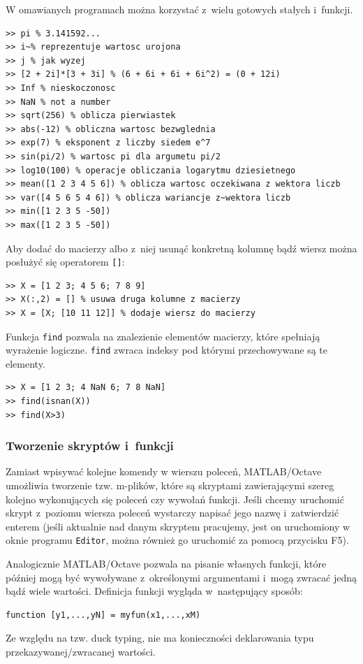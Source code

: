 W omawianych programach można korzystać z~wielu gotowych stałych i~funkcji. 
\begin{lstlisting}[caption=Przykładowe stałe i funkcje , label=lab1/lst/constantsAndFucntions]
>> pi % 3.141592...
>> i~% reprezentuje wartosc urojona
>> j % jak wyzej
>> [2 + 2i]*[3 + 3i] % (6 + 6i + 6i + 6i^2) = (0 + 12i)
>> Inf % nieskoczonosc
>> NaN % not a number
>> sqrt(256) % oblicza pierwiastek
>> abs(-12) % obliczna wartosc bezwglednia
>> exp(7) % eksponent z liczby siedem e^7
>> sin(pi/2) % wartosc pi dla argumetu pi/2
>> log10(100) % operacje obliczania logarytmu dziesietnego
>> mean([1 2 3 4 5 6]) % oblicza wartosc oczekiwana z wektora liczb
>> var([4 5 6 5 4 6]) % oblicza wariancje z~wektora liczb
>> min([1 2 3 5 -50])
>> max([1 2 3 5 -50])
\end{lstlisting}

Aby dodać do macierzy albo z~niej usunąć konkretną kolumnę bądź wiersz można posłużyć się operatorem \texttt{[]}:
\begin{lstlisting}[caption=Usuwanie i dodawanie wierszy/kolumn do macierzy , label=lab1/lst/matrixAddRemoveRowColumn]
>> X = [1 2 3; 4 5 6; 7 8 9]
>> X(:,2) = [] % usuwa druga kolumne z macierzy
>> X = [X; [10 11 12]] % dodaje wiersz do macierzy
\end{lstlisting}

Funkcja \texttt{find} pozwala na znalezienie elementów macierzy, które spełniają wyrażenie logiczne. \texttt{find} zwraca indeksy pod którymi przechowywane są te elementy.
\begin{lstlisting}[caption=Szukanie elementów macierzy spełniających warunek logiczny , label=lab1/lst/findFunction]
>> X = [1 2 3; 4 NaN 6; 7 8 NaN]
>> find(isnan(X))
>> find(X>3)
\end{lstlisting}

\subsubsection{Tworzenie skryptów i~funkcji}
Zamiast wpisywać kolejne komendy w wierszu poleceń, MATLAB/Octave umożliwia tworzenie tzw. m-plików, które są skryptami zawierającymi szereg kolejno wykonujących się poleceń czy wywołań funkcji. Jeśli chcemy uruchomić skrypt z~poziomu wiersza poleceń wystarczy napisać jego nazwę i~zatwierdzić enterem (jeśli aktualnie nad danym skryptem pracujemy, jest on uruchomiony w oknie programu \texttt{Editor}, można również go uruchomić za pomocą przycisku F5). 

Analogicznie MATLAB/Octave pozwala na pisanie własnych funkcji, które później mogą być wywoływane z~określonymi argumentami i~mogą zwracać jedną bądź wiele wartości. Definicja funkcji wygląda w~następujący sposób:
\begin{lstlisting}[caption=Prototyp funkcji w programie MATLAB/Octave , label=lab1/lst/matlabFunctionPrototype]
	function [y1,...,yN] = myfun(x1,...,xM)
\end{lstlisting} 
Ze względu na tzw. duck typing, nie ma konieczności deklarowania typu przekazywanej/zwracanej wartości.


